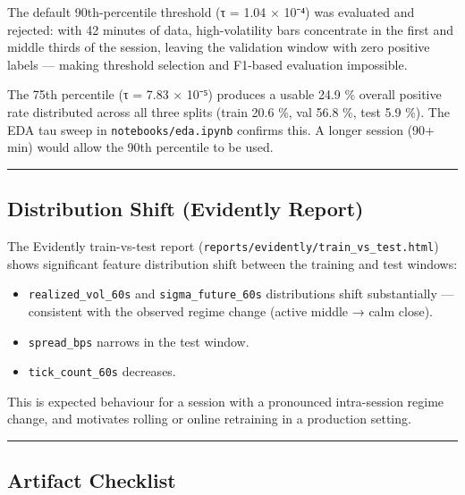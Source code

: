 \documentclass[
]{article}
\providecommand{\tightlist}{%
  \setlength{\itemsep}{0pt}\setlength{\parskip}{0pt}}
\begin{document}
The default 90th-percentile threshold (τ = 1.04 × 10⁻⁴) was evaluated
and rejected: with 42 minutes of data, high-volatility bars concentrate
in the first and middle thirds of the session, leaving the validation
window with zero positive labels --- making threshold selection and
F1-based evaluation impossible.

The 75th percentile (τ = 7.83 × 10⁻⁵) produces a usable 24.9 \% overall
positive rate distributed across all three splits (train 20.6 \%, val
56.8 \%, test 5.9 \%). The EDA tau sweep in \texttt{notebooks/eda.ipynb}
confirms this. A longer session (90+ min) would allow the 90th
percentile to be used.

\begin{center}\rule{0.5\linewidth}{0.5pt}\end{center}

\hypertarget{distribution-shift-evidently-report}{%
\subsection{Distribution Shift (Evidently
Report)}\label{distribution-shift-evidently-report}}

The Evidently train-vs-test report
(\texttt{reports/evidently/train\_vs\_test.html}) shows significant
feature distribution shift between the training and test windows:

\begin{itemize}
\tightlist
\item
  \texttt{realized\_vol\_60s} and \texttt{sigma\_future\_60s}
  distributions shift substantially --- consistent with the observed
  regime change (active middle → calm close).
\item
  \texttt{spread\_bps} narrows in the test window.
\item
  \texttt{tick\_count\_60s} decreases.
\end{itemize}

This is expected behaviour for a session with a pronounced intra-session
regime change, and motivates rolling or online retraining in a
production setting.

\begin{center}\rule{0.5\linewidth}{0.5pt}\end{center}

\hypertarget{artifact-checklist}{%
\subsection{Artifact Checklist}\label{artifact-checklist}}
\end{document}

